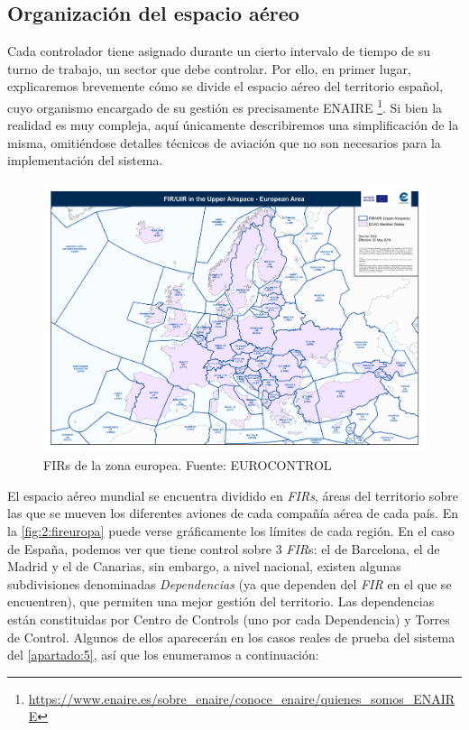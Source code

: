 \subsection{Organización del espacio aéreo}
\label{section:2:sectores-y-sectorizacion}
Cada controlador tiene asignado durante un cierto intervalo de tiempo de su turno de trabajo, un sector que debe controlar.
Por ello, en primer lugar, explicaremos brevemente cómo se divide el espacio aéreo del territorio español, cuyo organismo encargado de su gestión es precisamente ENAIRE%
\footnote{\url{https://www.enaire.es/sobre_enaire/conoce_enaire/quienes_somos_ENAIRE}}.
Si bien la realidad es muy compleja, aquí únicamente describiremos una simplificación de la misma, omitiéndose
detalles técnicos de aviación que no son necesarios para la implementación del sistema.

\begin{figure}
	\centering
	\includegraphics[width=\linewidth]{FIR_europa}
	\caption[FIRs de la zona europea]{FIRs de la zona europea. Fuente: EUROCONTROL}
	\label{fig:2:fireuropa}
\end{figure}

El espacio aéreo mundial se encuentra dividido en \textit{\glspl{FIR}}, áreas del territorio sobre las que se mueven los diferentes aviones de cada compañía aérea de cada país. En la \autoref{fig:2:fireuropa} puede verse gráficamente los límites de cada región.
En el caso de España, podemos ver que tiene control sobre 3 \textit{FIR}s: el de Barcelona, el de Madrid y el de Canarias, sin embargo, a nivel nacional, existen algunas subdivisiones denominadas \textit{Dependencias} (ya que dependen del \textit{FIR} en el que se encuentren), que permiten una mejor gestión del territorio. Las dependencias están constituidas por \glspl{Centro de Control} (uno por cada Dependencia) y Torres de Control. Algunos de ellos aparecerán en los casos reales de prueba del sistema del \autoref{apartado:5}, así que los enumeramos a continuación:

